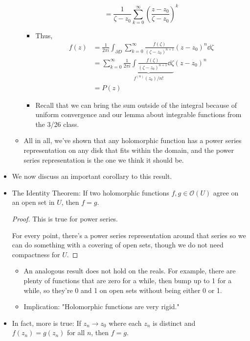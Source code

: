 \documentclass[../notes.tex]{subfiles}
\begin{document}
\begin{itemize}
\begin{itemize}
\begin{itemize}
\begin{equation*}
                = \frac{1}{\zeta-z_0}\sum_{k=0}^\infty\left( \frac{z-z_0}{\zeta-z_0} \right)^k
            \end{equation*}
            \item Thus,
            \begin{align*}
                f(z) &= \frac{1}{2\pi i}\int_{\partial D}\sum_{k=0}^\infty\frac{f(\zeta)}{(\zeta-z_0)^{n+1}}(z-z_0)^n\dd\zeta\\
                &= \sum_{k=0}^\infty\underbrace{\frac{1}{2\pi i}\int\frac{f(\zeta)}{(\zeta-z_0)^{n+1}}\dd\zeta}_{f^{(n)}(z_0)/n!}(z-z_0)^n\\
                &= P(z)
            \end{align*}
            \item Recall that we can bring the sum outside of the integral because of uniform convergence and our lemma about integrable functions from the 3/26 class.
        \end{itemize}
        \item All in all, we've shown that any holomorphic function has a power series representation on any disk that fits within the domain, and the power series representation is the one we think it should be.
    \end{itemize}
    \item We now discuss an important corollary to this result.
    \item The Identity Theorem: If two holomorphic functions $f,g\in\mathcal{O}(U)$ agree on an open set in $U$, then $f=g$.
    \begin{proof}
        This is true for power series.\par
        For every point, there's a power series representation around that series so we can do something with a covering of open sets, though we do not need compactness for $U$.
    \end{proof}
    \begin{itemize}
        \item An analogous result does not hold on the reals. For example, there are plenty of functions that are zero for a while, then bump up to 1 for a while, so they're 0 and 1 on open sets without being either 0 or 1.
        \item Implication: "Holomorphic functions are very rigid."
    \end{itemize}
    \item In fact, more is true: If $z_n\to z_0$ where each $z_n$ is distinct and $f(z_n)=g(z_n)$ for all $n$, then $f=g$.

\end{itemize}
\end{document}
